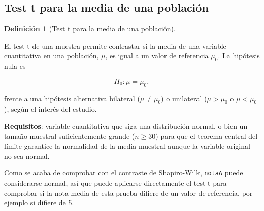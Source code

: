 \documentclass[
  spanish,
  a4paper,
]{scrreport}
\theoremstyle{definition}
\theoremstyle{definition}
\newtheorem{definition}{Definición}[chapter]
\theoremstyle{remark}
\begin{document}
\subsection{Test t para la media de una
población}\label{test-t-para-la-media-de-una-poblaciuxf3n}

\begin{definition}[Test t para la media de una
población]\protect\hypertarget{def-unapoblacion-test-t-media}{}\label{def-unapoblacion-test-t-media}

El test t de una muestra permite contrastar si la media de una variable
cuantitativa en una población, \(\mu\), es igual a un valor de
referencia \(\mu_0\). La hipótesis nula es

\[H_0: \mu = \mu_0,\]

frente a una hipótesis alternativa bilateral (\(\mu \neq \mu_0\)) o
unilateral (\(\mu > \mu_0\) o \(\mu < \mu_0\)), según el interés del
estudio.

\end{definition}

\textbf{Requisitos}: variable cuantitativa que siga una distribución
normal, o bien un tamaño muestral suficientemente grande (\(n \geq 30\))
para que el teorema central del límite garantice la normalidad de la
media muestral aunque la variable original no sea normal.

Como se acaba de comprobar con el contraste de Shapiro-Wilk,
\texttt{notaA} puede considerarse normal, así que puede aplicarse
directamente el test t para comprobar si la nota media de esta prueba
difiere de un valor de referencia, por ejemplo si difiere de 5.
\end{document}
